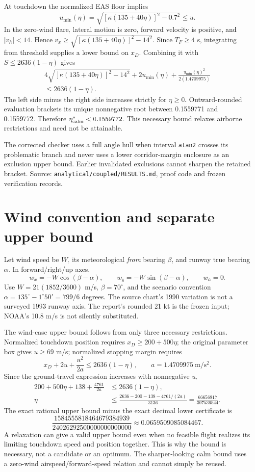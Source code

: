 At touchdown the normalized EAS floor implies
\[
u_{\min}(\eta)=\sqrt{[\kappa(135+40\eta)]^2-0.7^2}\leq u.
\]
In the zero-wind flare, lateral motion is zero, forward velocity is positive, and $|v_h|<14$. Hence $v_x\geq\sqrt{[\kappa(135+40\eta)]^2-14^2}$. Since $T_F\geq4$ s, integrating from threshold supplies a lower bound on $x_D$. Combining it with $S\leq2636(1-\eta)$ gives
\begin{multline}
4\sqrt{[\kappa(135+40\eta)]^2-14^2}+2u_{\min}(\eta)
+\frac{u_{\min}(\eta)^2}{2(1.4709975)}\\
\leq2636(1-\eta).
\end{multline}
The left side minus the right side increases strictly for $\eta\geq0$. Outward-rounded evaluation brackets its unique nonnegative root between 0.1559771 and 0.1559772. Therefore $\eta^*_{\rm calm}<0.1559772$. This necessary bound relaxes airborne restrictions and need not be attainable.

The corrected checker uses a full angle hull when interval \texttt{atan2} crosses its problematic branch and never uses a lower corridor-margin enclosure as an exclusion upper bound. Earlier invalidated exclusions cannot sharpen the retained bracket. Source: \texttt{analytical/coupled/RESULTS.md}, proof code and frozen verification records.
\par\medskip
\section{Wind convention and separate upper bound}\label{app:windbound}
Let wind speed be $W$, its meteorological \emph{from} bearing $\beta$, and runway true bearing $\alpha$. In forward/right/up axes,
\[
w_x=-W\cos(\beta-\alpha),\qquad w_y=-W\sin(\beta-\alpha),\qquad w_h=0.
\]
Use $W=21(1852/3600)$ m/s, $\beta=70^\circ$, and the scenario convention $\alpha=135^\circ-1^\circ50'=799/6$ degrees. The source chart's 1990 variation is not a surveyed 1993 runway axis. The report's rounded 21 kt is the frozen input; NOAA's 10.8 m/s is not silently substituted.

The wind-case upper bound follows from only three necessary restrictions. Normalized touchdown position requires $x_D\geq200+500\eta$; the original parameter box gives $u\geq69$ m/s; normalized stopping margin requires
\[
x_D+2u+\frac{u^2}{2a}\leq2636(1-\eta),\qquad a=1.4709975\ \mathrm{m/s^2}.
\]
Since the ground-travel expression increases with nonnegative $u$,
\begin{align}
200+500\eta+138+\frac{4761}{2a}&\leq2636(1-\eta),\\
\eta&\leq\frac{2636-200-138-4761/(2a)}{3136}
=\frac{66656817}{307536544}.
\end{align}
The exact rational upper bound minus the exact decimal lower certificate is
\[
\frac{1584555818464679384939}{24026292500000000000000}
\approx0.0659509085084467.
\]
A relaxation can give a valid upper bound even when no feasible flight realizes its limiting touchdown speed and position together. This is why the bound is necessary, not a candidate or an optimum. The sharper-looking calm bound uses a zero-wind airspeed/forward-speed relation and cannot simply be reused.

